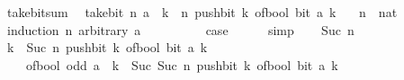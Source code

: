 \begin{isabellebody}
\endisatagproof
{\isafoldproof}%
%
\isadelimproof
\isanewline
%
\endisadelimproof
\isanewline
{}\isamarkupfalse%
\ take{\isacharunderscore}{\kern0pt}bit{\isacharunderscore}{\kern0pt}sum{\isacharcolon}{\kern0pt}\isanewline
\ \ {\isachardoublequoteopen}take{\isacharunderscore}{\kern0pt}bit\ n\ a\ {\isacharequal}{\kern0pt}\ {\isacharparenleft}{\kern0pt}{\isasymSum}k\ {\isacharequal}{\kern0pt}\ {}{\isachardot}{\kern0pt}{\isachardot}{\kern0pt}{\isacharless}{\kern0pt}n{\isachardot}{\kern0pt}\ push{\isacharunderscore}{\kern0pt}bit\ k\ {\isacharparenleft}{\kern0pt}of{\isacharunderscore}{\kern0pt}bool\ {\isacharparenleft}{\kern0pt}bit\ a\ k{\isacharparenright}{\kern0pt}{\isacharparenright}{\kern0pt}{\isacharparenright}{\kern0pt}{\isachardoublequoteclose}\isanewline
\ \ \ n\ {\isacharcolon}{\kern0pt}{\isacharcolon}{\kern0pt}\ nat\isanewline
%
\isadelimproof
%
\endisadelimproof
%
\isatagproof
{}\isamarkupfalse%
\ {\isacharparenleft}{\kern0pt}induction\ n\ arbitrary{\isacharcolon}{\kern0pt}\ a{\isacharparenright}{\kern0pt}\isanewline
\ \ \isamarkupfalse%
\ {}\isanewline
\ \ \isamarkupfalse%
\ \isamarkupfalse%
\ {\isacharquery}{\kern0pt}case\isanewline
\ \ \ \ \isamarkupfalse%
\ simp\isanewline
{}\isamarkupfalse%
\isanewline
\ \ \isamarkupfalse%
\ {\isacharparenleft}{\kern0pt}Suc\ n{\isacharparenright}{\kern0pt}\isanewline
\ \ \isamarkupfalse%
\ {\isachardoublequoteopen}{\isacharparenleft}{\kern0pt}{\isasymSum}k\ {\isacharequal}{\kern0pt}\ {}{\isachardot}{\kern0pt}{\isachardot}{\kern0pt}{\isacharless}{\kern0pt}Suc\ n{\isachardot}{\kern0pt}\ push{\isacharunderscore}{\kern0pt}bit\ k\ {\isacharparenleft}{\kern0pt}of{\isacharunderscore}{\kern0pt}bool\ {\isacharparenleft}{\kern0pt}bit\ a\ k{\isacharparenright}{\kern0pt}{\isacharparenright}{\kern0pt}{\isacharparenright}{\kern0pt}\ {\isacharequal}{\kern0pt}\ \isanewline
\ \ \ \ of{\isacharunderscore}{\kern0pt}bool\ {\isacharparenleft}{\kern0pt}odd\ a{\isacharparenright}{\kern0pt}\ {\isacharplus}{\kern0pt}\ {\isacharparenleft}{\kern0pt}{\isasymSum}k\ {\isacharequal}{\kern0pt}\ Suc\ {}{\isachardot}{\kern0pt}{\isachardot}{\kern0pt}{\isacharless}{\kern0pt}Suc\ n{\isachardot}{\kern0pt}\ push{\isacharunderscore}{\kern0pt}bit\ k\ {\isacharparenleft}{\kern0pt}of{\isacharunderscore}{\kern0pt}bool\ {\isacharparenleft}{\kern0pt}bit\ a\ k{\isacharparenright}{\kern0pt}{\isacharparenright}{\kern0pt}{\isacharparenright}{\kern0pt}{\isachardoublequoteclose}\isanewline

\end{isabellebody}
